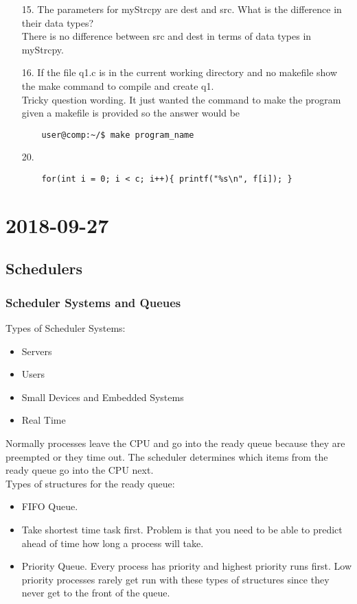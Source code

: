 \documentclass{report}
\newcommand{\mychapter}[2]{
	\setcounter{chapter}{#1}
	\setcounter{section}{0}
	\chapter*{#2}
	\addcontentsline{toc}{chapter}{#2}
}
\begin{document}
\begin{enumerate}
\item[15.]The parameters for myStrcpy are dest and src. What is the difference in their data types?\\
	There is no difference between src and dest in terms of data types in myStrcpy.

\item[16.]If the file q1.c is in the current working directory and no makefile show the make command to compile and create q1.\\
	Tricky question wording. It just wanted the command to make the program given a makefile is provided so the answer would be
	\begin{verbatim}
	user@comp:~/$ make program_name
	\end{verbatim}

\item[20.]
	\begin{verbatim}
	for(int i = 0; i < c; i++){ printf("%s\n", f[i]); }
	\end{verbatim}


\end{enumerate}

\mychapter{3}{2018-09-27}
\section*{Schedulers}
\subsection*{Scheduler Systems and Queues}
Types of Scheduler Systems:
\begin{itemize}
	\item Servers
	\item Users
	\item Small Devices and Embedded Systems
	\item Real Time
\end{itemize}

\noindent
Normally processes leave the CPU and go into the ready queue because they are preempted or they time out. The scheduler determines which items from the ready queue go into the CPU next.\\

\noindent
Types of structures for the ready queue:
\begin{itemize}
	\item FIFO Queue.
	\item Take shortest time task first. Problem is that you need to be able to predict ahead of time how long a process will take.
	\item Priority Queue. Every process has priority and highest priority runs first. Low priority processes rarely get run with these types of structures since they never get to the front of the queue.
\end{itemize}
\end{document}
